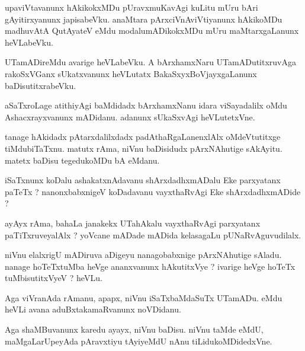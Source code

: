 \documentclass{article}
\begin{document}
\begin{mn}
upaviVtavanunx  hAkikokxMDu  pUravxmuKavAgi  kuLitu  mUru  bAri  gAyitirxyanunx  japisabeVku.  anaMtara  pArxciVnAviVtiyanunx  
hAkikoMDu  madhuvAtA  QutAyateV  eMdu  modalumADikokxMDu  mUru  maMtarxgaLanunx  heVLabeVku.
\end{mn}

\begin{mn}
UTamADireMdu  avarige  heVLabeVku.  A  bArxhamxNaru  UTamADutitxruvAga  rakoSxVGanx  sUkatxvanunx  heVLutatx  
BakaSxyxBoVjayxgaLanunx  baDisutitxrabeVku.
\end{mn}

\begin{mn}
aSaTxroLage  atithiyAgi  baMdidadx  bArxhamxNanu  idara  viSayadalilx  oMdu  Ashacxrayxvanunx  mADidanu.  adanunx  
sUkaSxvAgi  heVLutetxVne.
\end{mn}

\begin{mn}
tanage  hAkidadx  pAtarxdalilxdadx  padAthaRgaLanenxlAlx  oMdeVtutitxge  tiMdubiTaTxnu.  matutx  rAma,  niVnu  baDisidudx  
pArxNAhutige  sAkAyitu.  matetx  baDisu  tegedukoMDu  bA  eMdanu.
\end{mn}

\begin{mn}
iSaTxnunx  koDalu  ashakatxnAdavanu  shArxdadhxmADalu  Eke  parxyatanx paTeTx ?  nanonxbabxnigeV  koDadavanu  vayxthaRvAgi  
Eke  shArxdadhxmADide ?
\end{mn}

\begin{mn}
ayAyx  rAma,  bahaLa  janakekx  UTahAkalu  vayxthaRvAgi  parxyatanx paTiTxruveyalAlx ?  yoVcane  mADade  mADida  kelasagaLu  pUNaRvAguvudilalx.
\end{mn}

\begin{mn}
niVnu  elalxrigU  mADiruva  aDigeyu  nanagobabxnige  pArxNAhutige  sAladu.  nanage  hoTeTxtuMba  heVge  ananxvanunx  hAkutitxVye ?  
ivarige  heVge  hoTeTx  tuMbisutitxVyeV ?  heVLu.
\end{mn}

\begin{mn}
Aga  viVranAda  rAmanu,  apapx,  niVnu  iSaTxbaMdaSuTx  UTamADu.  eMdu  heVLi  avana  aduBxtakamaRvanunx  noVDidanu.
\end{mn}

\begin{mn}
Aga  shaMBuvanunx  karedu  ayayx,  niVnu  baDisu.  niVnu  taMde  eMdU,  maMgaLarUpeyAda  pAravxtiyu  tAyiyeMdU  nAnu  tiLidukoMDidedxVne.
\end{mn}
\end{document}
